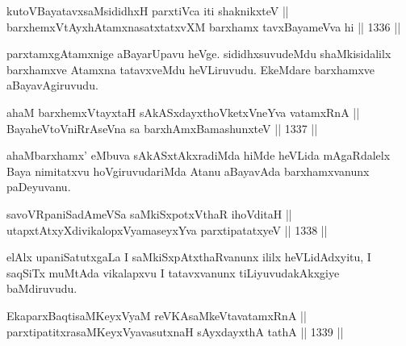 \begin{shl}
kutoV\s BayatavxsaMsididhxH parxtiVca iti shaknikxteV || \\
barxhemxVtAyxhA\s \s tamxnasatxtatxvXM barxhamx tavxBayameVva hi \hfill || 1336 ||  
\end{shl}

\begin{artha}
parxtamxgAtamxnige aBayarUpavu heVge. sididhxsuvudeMdu shaMkisidalilx barxhamxve Atamxna tatavxveMdu heVLiruvudu. EkeMdare barxhamxve aBayavAgiruvudu.
\end{artha}

\begin{shl}
ahaM barxhemxVtayxtaH sAkASxdayxthoVketxVneYva vatamxRnA  || \\
BayaheVtoVniRrAseVna sa barxhAmxBamashunxteV \hfill || 1337 ||  
\end{shl}

\begin{artha}
ahaMbarxhamx' eMbuva sAkASxtAkxradiMda hiMde heVLida mAgaRdalelx Baya nimitatxvu hoVgiruvudariMda Atanu aBayavAda barxhamxvanunx paDeyuvanu.
\end{artha}


\begin{shl}
savoVRpaniSadAmeVSa saMkiSxpotxV\s thaR ihoVditaH || \\
utapxtAtxyXdivikalopxV\s yamaseyxYva parxtipatatxyeV \hfill || 1338 ||  
\end{shl}

\begin{artha}
elAlx upaniSatutxgaLa I saMkiSxpAtxthaRvanunx ililx heVLidAdxyitu, I saqSiTx muMtAda vikalapxvu I tatavxvanunx tiLiyuvudakAkxgiye baMdiruvudu.
\end{artha}


\begin{shl}
\footnotemark[1]EkaparxBaqtisaMKeyxVyaM reVKAsaMkeVtavatamxRnA || \\
parxtipatitxrasaMKeyxVyavasutxnaH sAyxdayxthA tathA \hfill || 1339 ||  
\end{shl}
				

